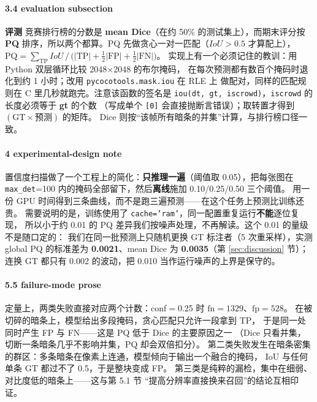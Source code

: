 \documentclass{article}
\begin{document}
\paragraph{3.4 evaluation subsection}
\textbf{评测}
竞赛排行榜的分数是 \textbf{mean Dice}（在约 50\% 的测试集上），而期末评分按 \textbf{PQ}
排序，所以两个都算。PQ 先做贪心一对一匹配（$IoU>0.5$ 才算配上），
$\mathrm{PQ}=\sum_{\mathrm{TP}} IoU \,/\,\bigl(|\mathrm{TP}|+\tfrac12|\mathrm{FP}|+\tfrac12|\mathrm{FN}|\bigr)$。
实现上有一个必须记住的教训：用 Python 双层循环比较 2048$\times$2048 的布尔掩码，
在每次预测都有数百个掩码时退化到约 1 小时；改用 \texttt{pycocotools.mask.iou} 在 RLE 上
做配对，同样的匹配规则在 C 里几秒就跑完。注意该函数的签名是
\texttt{iou(dt, gt, iscrowd)}，\texttt{iscrowd} 的长度必须等于 \textbf{gt} 的个数
（写成单个 \texttt{[0]} 会直接抛断言错误）；取转置才得到 $(\text{GT}\times\text{预测})$ 的矩阵。
Dice 则按“该帧所有暗条的并集”计算，与排行榜口径一致。

\paragraph{4 experimental-design note}
置信度扫描做了一个工程上的简化：\textbf{只推理一遍}（阈值取 0.05），把每张图在
\texttt{max\_det}=100 内的掩码全部留下，然后\textbf{离线}施加 0.10/0.25/0.50 三个阈值。
用一份 GPU 时间得到三条曲线，而不是跑三遍预测——在这个任务上预测比训练还贵。
需要说明的是，训练使用了 \texttt{cache='ram'}，同一配置重复运行\textbf{不能}逐位复现，
所以小于约 0.01 的 PQ 差异我们按噪声处理，不再解读。这个 0.01 的量级不是随口定的：
我们在同一批预测上只随机更换 GT 标注者（5 次重采样），实测 global PQ 的标准差为
\textbf{0.0021}、mean Dice 为 \textbf{0.0035}（第 \ref{sec:discussion} 节）；
连换 GT 都只有 0.002 的波动，把 0.010 当作运行噪声的上界是保守的。

\paragraph{5.5 failure-mode prose}
定量上，两类失败直接对应两个计数：conf$=$0.25 时 $\mathrm{fn}=1329$、$\mathrm{fp}=528$。
在被切碎的暗条上，模型给出多段掩码，贪心匹配只允许一段拿到 TP，
于是同一处同时产生 FP 与 FN——这是 PQ 低于 Dice 的主要原因之一
（Dice 只看并集，切断一条暗条几乎不影响并集，PQ 却会双倍扣分）。
第二类失败发生在暗条密集的群区：多条暗条在像素上连通，模型倾向于输出一个融合的掩码，
IoU 与任何单条 GT 都过不了 0.5，于是整块变成 FP。
第三类是纯粹的漏检，集中在细弱、对比度低的暗条上——这与第 5.1 节
“提高分辨率直接换来召回”的结论互相印证。
\end{document}
